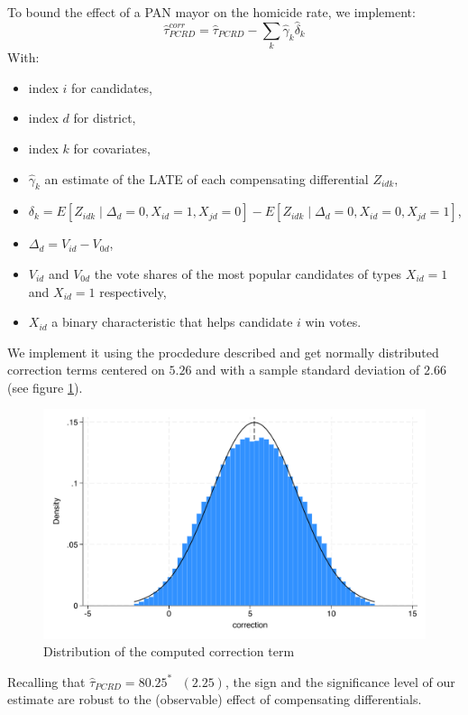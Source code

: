 \documentclass{article}
\begin{document}
To bound the effect of a PAN mayor on the homicide rate, we implement:
\[
\hat{\tau}^{corr}_{PCRD}
=\hat{\tau}_{PCRD}
-\sum_{k} \hat{\gamma}_k \hat{\delta}_k
\]
With:
\begin{itemize}
    \item index \(i\) for candidates,
    \item index \(d\) for district,
    \item index \(k\) for covariates,
    \item \(\hat{\gamma}_k\) an estimate of the LATE of each compensating differential \(Z_{idk}\),
    \item
    \(
    \delta_k
    =
    E[Z_{idk}\mid \Delta_d = 0, X_{id}=1, X_{jd}=0]
    -
    E[Z_{idk}\mid \Delta_d = 0, X_{id}=0, X_{jd}=1]
    \),
    \item
    \(
    \Delta_d
    =
    V_{id}-V_{0d}
    \),
    \item \( V_{id}\) and \(V_{0d}\) the vote shares of the most popular candidates of types \(X_{id}=1\) and \(X_{id}=1\) respectively,
    \item  \(X_{id}\) a binary characteristic that helps candidate \(i\) win votes.
\end{itemize}

We implement it using the procdedure described and get normally distributed correction terms centered on \(5.26\) and with a sample standard deviation of \(2.66\) (see figure \ref{fig:correction}).
\begin{figure}[H]
    \centering
    \includegraphics[scale=0.5]{../outputs/correction_term_distribution_plot.pdf}
    \caption{Distribution of the computed correction term}
    \label{fig:correction}
\end{figure}

Recalling that \(\hat{\tau}_{PCRD} = 80.25^{*}\text{ }(2.25)\), the sign and the significance level of our estimate are robust to the (observable) effect of compensating differentials.
\end{document}
